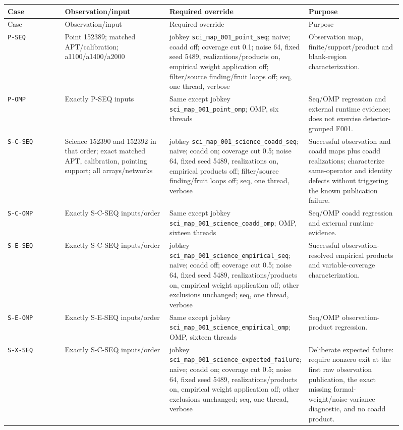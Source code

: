 \documentclass[11pt]{article}
\newcommand{\code}[1]{\nolinkurl{#1}}
\begin{document}
\begin{longtable}{L{0.15\linewidth}L{0.27\linewidth}L{0.25\linewidth}L{0.24\linewidth}}
\toprule
Case & Observation/input & Required override & Purpose\\
\midrule
\endfirsthead
\toprule
Case & Observation/input & Required override & Purpose\\
\midrule
\endhead
\code{P-SEQ} & Point 152389; matched APT/calibration; a1100/a1400/a2000 &
jobkey \code{sci_map_001_point_seq}; naive; coadd off; coverage cut 0.1; noise
64, fixed seed 5489, realizations/products on, empirical weight application off;
filter/source finding/fruit loops off; seq, one thread, verbose & Observation
map, finite/support/product and blank-region characterization.\\
\code{P-OMP} & Exactly P-SEQ inputs & Same except jobkey
\code{sci_map_001_point_omp}; OMP, six threads & Seq/OMP regression and
external runtime evidence; does not exercise detector-grouped F001.\\
\code{S-C-SEQ} & Science 152390 and 152392 in that order; exact matched APT,
calibration, pointing support; all arrays/networks & jobkey
\code{sci_map_001_science_coadd_seq}; naive; coadd on; coverage cut 0.5; noise
64, fixed seed 5489, realizations on, empirical products off; filter/source
finding/fruit loops off; seq, one thread, verbose & Successful observation and
coadd maps plus coadd realizations; characterize same-operator and identity
defects without triggering the known publication failure.\\
\code{S-C-OMP} & Exactly S-C-SEQ inputs/order & Same except jobkey
\code{sci_map_001_science_coadd_omp}; OMP, sixteen threads & Seq/OMP coadd
regression and external runtime evidence.\\
\code{S-E-SEQ} & Exactly S-C-SEQ inputs/order & jobkey
\code{sci_map_001_science_empirical_seq}; naive; coadd off; coverage cut 0.5;
noise 64, fixed seed 5489, realizations/products on, empirical weight application
off; other exclusions unchanged; seq, one thread, verbose & Successful
observation-resolved empirical products and variable-coverage characterization.\\
\code{S-E-OMP} & Exactly S-E-SEQ inputs/order & Same except jobkey
\code{sci_map_001_science_empirical_omp}; OMP, sixteen threads & Seq/OMP
observation-product regression.\\
\code{S-X-SEQ} & Exactly S-C-SEQ inputs/order & jobkey
\code{sci_map_001_science_expected_failure}; naive; coadd on; coverage cut 0.5;
noise 64, fixed seed 5489, realizations/products on, empirical weight application
off; other exclusions unchanged; seq, one thread, verbose & Deliberate expected
failure: require nonzero exit at the first raw observation publication, the exact
missing formal-weight/noise-variance diagnostic, and no coadd product.\\
\bottomrule
\end{longtable}
\end{document}
